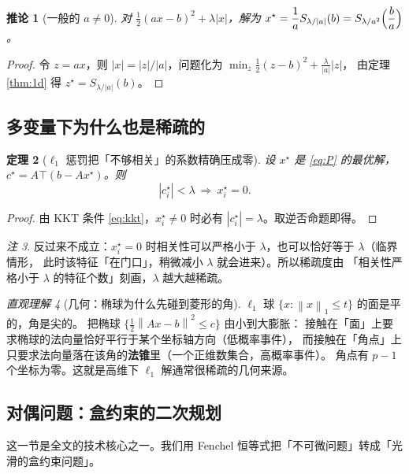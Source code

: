 \documentclass[11pt,a4paper,UTF8]{ctexart}
\theoremstyle{plain}
\newtheorem{theorem}{定理}[section]
\newtheorem{corollary}[theorem]{推论}
\theoremstyle{definition}
\theoremstyle{remark}
\newtheorem{remark}[theorem]{注}
\newtheorem{intuition}[theorem]{直观理解}
\newcommand{\norm}[1]{\left\lVert #1 \right\rVert}
\newcommand{\abs}[1]{\left\lvert #1 \right\rvert}
\begin{document}
\begin{corollary}[一般的 $a\neq0$]
对 $\tfrac12(ax-b)^2+\lambda\abs{x}$，解为
$\displaystyle x^\star=\frac1aS_{\lambda/\abs a}(b)=S_{\lambda/a^2}\Bigl(\frac ba\Bigr)$。
\end{corollary}

\begin{proof}
令 $z=ax$，则 $\abs x=\abs z/\abs a$，问题化为 $\min_z\tfrac12(z-b)^2+\frac{\lambda}{\abs a}\abs z$，
由定理 \ref{thm:1d} 得 $z^\star=S_{\lambda/\abs a}(b)$。
\end{proof}

\subsection{多变量下为什么也是稀疏的}

\begin{theorem}[$\ell_1$ 惩罚把「不够相关」的系数精确压成零]\label{thm:sparse}
设 $x^\star$ 是 \eqref{eq:P} 的最优解，$c^\star=A\top(b-Ax^\star)$。则
\[
\abs{c_i^\star}<\lambda\ \Longrightarrow\ x_i^\star=0 .
\]
\end{theorem}

\begin{proof}
由 KKT 条件 \eqref{eq:kkt}，$x_i^\star\neq0$ 时必有 $\abs{c_i^\star}=\lambda$。取逆否命题即得。
\end{proof}

\begin{remark}
反过来不成立：$x_i^\star=0$ 时相关性可以严格小于 $\lambda$，也可以恰好等于 $\lambda$（临界情形，
此时该特征「在门口」，稍微减小 $\lambda$ 就会进来）。所以稀疏度由
「相关性严格小于 $\lambda$ 的特征个数」刻画，$\lambda$ 越大越稀疏。
\end{remark}

\begin{intuition}[几何：椭球为什么先碰到菱形的角]
$\ell_1$ 球 $\{x:\norm x_1\le t\}$ 的面是平的，角是尖的。
把椭球 $\{\tfrac12\norm{Ax-b}^2\le c\}$ 由小到大膨胀：
接触在「面」上要求椭球的法向量恰好平行于某个坐标轴方向（低概率事件），
而接触在「角点」上只要求法向量落在该角的\textbf{法锥}里（一个正维数集合，高概率事件）。
角点有 $p-1$ 个坐标为零。这就是高维下 $\ell_1$ 解通常很稀疏的几何来源。
\end{intuition}

\subsection{对偶问题：盒约束的二次规划}

这一节是全文的技术核心之一。我们用 Fenchel 恒等式把「不可微问题」转成「光滑的盒约束问题」。
\end{document}
